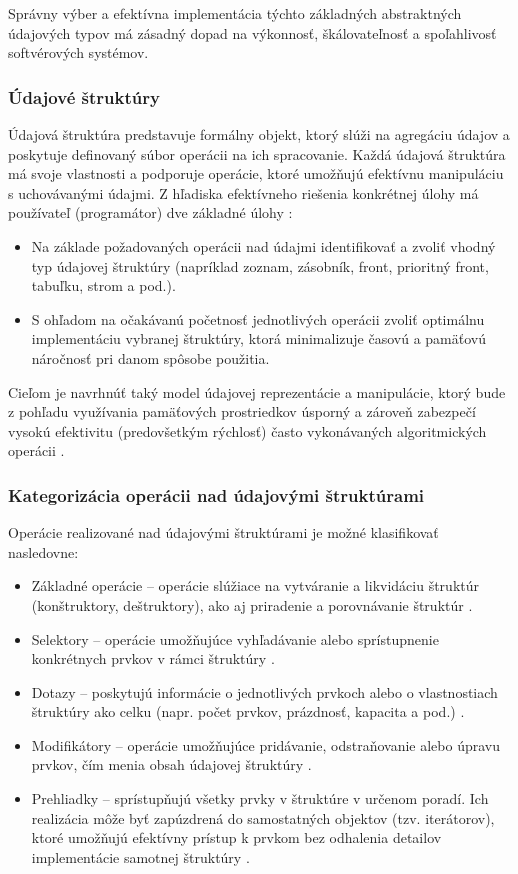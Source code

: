 \documentclass[11pt]{article}
\begin{document}
Správny výber a efektívna implementácia týchto základných abstraktných údajových typov má zásadný dopad na výkonnosť, škálovateľnosť a spoľahlivosť softvérových systémov.

\subsubsection{Údajové štruktúry}

Údajová štruktúra predstavuje formálny objekt, ktorý slúži na agregáciu údajov a poskytuje definovaný súbor operácii na ich spracovanie. Každá údajová štruktúra má svoje vlastnosti a podporuje operácie, ktoré umožňujú efektívnu manipuláciu s uchovávanými údajmi. Z hľadiska efektívneho riešenia konkrétnej úlohy má používateľ (programátor) dve základné úlohy \cite{prednaska_aus1}:

\begin{itemize}
  \item Na základe požadovaných operácii nad údajmi identifikovať a zvoliť vhodný typ údajovej štruktúry (napríklad zoznam, zásobník, front, prioritný front, tabuľku, strom a pod.).
  \item S ohľadom na očakávanú početnosť jednotlivých operácii zvoliť optimálnu implementáciu vybranej štruktúry, ktorá minimalizuje časovú a pamäťovú náročnosť pri danom spôsobe použitia.
\end{itemize}

Cieľom je navrhnúť taký model údajovej reprezentácie a manipulácie, ktorý bude z pohľadu využívania pamäťových prostriedkov úsporný a zároveň zabezpečí vysokú efektivitu (predovšetkým rýchlosť) často vykonávaných algoritmických operácii \cite{aus1}.

\subsubsection*{Kategorizácia operácii nad údajovými štruktúrami}

Operácie realizované nad údajovými štruktúrami je možné klasifikovať nasledovne:

\begin{itemize}
  \item Základné operácie -- operácie slúžiace na vytváranie a likvidáciu štruktúr (konštruktory, deštruktory), ako aj priradenie a porovnávanie štruktúr \cite{aus3}.
  \item Selektory -- operácie umožňujúce vyhľadávanie alebo sprístupnenie konkrétnych prvkov v rámci štruktúry \cite{aus3}.
  \item Dotazy -- poskytujú informácie o jednotlivých prvkoch alebo o vlastnostiach štruktúry ako celku (napr. počet prvkov, prázdnosť, kapacita a pod.) \cite{aus3}.
  \item Modifikátory -- operácie umožňujúce pridávanie, odstraňovanie alebo úpravu prvkov, čím menia obsah údajovej štruktúry \cite{aus3}.
  \item Prehliadky -- sprístupňujú všetky prvky v štruktúre v určenom poradí. Ich realizácia môže byť zapúzdrená do samostatných objektov (tzv. iterátorov), ktoré umožňujú efektívny prístup k prvkom bez odhalenia detailov implementácie samotnej štruktúry \cite{aus3}.
\end{itemize}
\end{document}
